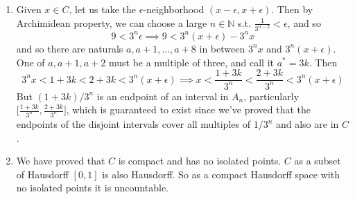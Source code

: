 \begin{solution}
\begin{enumerate}
      \item Given $x \in C$, let us take the $\epsilon$-neighborhood $(x - \epsilon, x + \epsilon)$. Then by Archimidean property, we can choose a large $n \in \mathbb{N}$ s.t. $\frac{1}{3^{n-2}} < \epsilon$, and so 
      \begin{equation}
        9 < 3^{n} \epsilon \implies 9 < 3^n (x + \epsilon) - 3^n x
      \end{equation}
      and so there are naturals $a, a+1, \ldots, a+8$ in between $3^n x$ and $3^n (x + \epsilon)$. One of $a, a+1, a+2$ must be a multiple of three, and call it $a^\ast = 3k$. Then 
      \begin{equation}
        3^n x < 1 + 3k < 2 + 3k < 3^n (x + \epsilon) \implies x < \frac{1 + 3k}{3^n} < \frac{2 + 3k}{3^n} < 3^n (x + \epsilon)
      \end{equation}
      But $(1 + 3k)/3^n$ is an endpoint of an interval in $A_n$, particularly $\big[\frac{1+3k}{3^n}, \frac{2 + 3k}{3^n} \big]$, which is guaranteed to exist since we've proved that the endpoints of the disjoint intervals cover all multiples of $1/3^n$ and also are in $C$.  

      \item We have proved that $C$ is compact and has no isolated points. $C$ as a subset of Hausdorff $[0, 1]$ is also Hausdorff. So as a compact Hausdorff space with no isolated points it is uncountable. 
    \end{enumerate}
  \end{solution}

